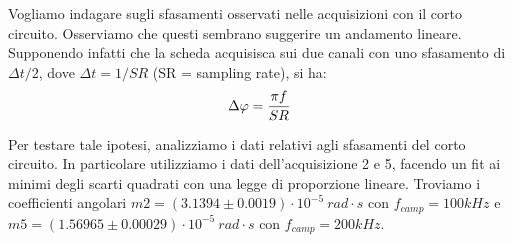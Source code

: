 
Vogliamo indagare sugli sfasamenti osservati nelle acquisizioni con il corto circuito. Osserviamo che questi sembrano suggerire un andamento lineare. Supponendo infatti che la scheda acquisisca sui due canali con uno sfasamento di $\Delta t / 2$, dove $\Delta t = 1/{SR}$ (SR = sampling rate), si ha:
\begin{equation}
     \Delta \phi = {{\pi  f}\over{SR}}
 \end{equation}

Per testare tale ipotesi, analizziamo i dati relativi agli sfasamenti del corto circuito. In particolare utilizziamo i dati dell'acquisizione 2 e 5, facendo un fit ai minimi degli scarti quadrati con una legge di proporzione lineare. Troviamo i coefficienti angolari $m2 = (3.1394 \pm 0.0019) \cdot 10^{-5} \: rad \cdot s$ con $ f_{camp} = 100kHz$ e $m5 = (1.56965 \pm 0.00029) \cdot 10^{-5} \: rad \cdot s$ con $f_{camp} = 200kHz$.

